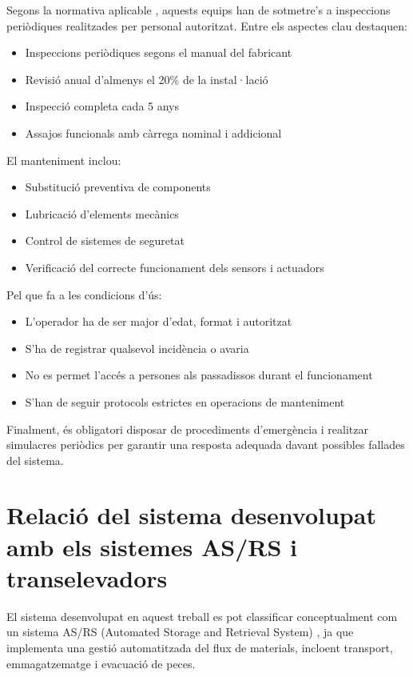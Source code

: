 \documentclass[12pt,a4paper]{report}
\begin{document}
Segons la normativa aplicable \cite{manual_logistica}, aquests equips han de sotmetre's a inspeccions periòdiques realitzades per personal autoritzat. Entre els aspectes clau destaquen:

\begin{itemize}
    \item Inspeccions periòdiques segons el manual del fabricant
    \item Revisió anual d'almenys el 20\% de la instal·lació
    \item Inspecció completa cada 5 anys
    \item Assajos funcionals amb càrrega nominal i addicional
\end{itemize}

El manteniment inclou:

\begin{itemize}
    \item Substitució preventiva de components
    \item Lubricació d'elements mecànics
    \item Control de sistemes de seguretat
    \item Verificació del correcte funcionament dels sensors i actuadors
\end{itemize}

Pel que fa a les condicions d'ús:

\begin{itemize}
    \item L'operador ha de ser major d'edat, format i autoritzat
    \item S'ha de registrar qualsevol incidència o avaria
    \item No es permet l'accés a persones als passadissos durant el funcionament
    \item S'han de seguir protocols estrictes en operacions de manteniment
\end{itemize}

Finalment, és obligatori disposar de procediments d'emergència i realitzar simulacres periòdics per garantir una resposta adequada davant possibles fallades del sistema.

\section{Relació del sistema desenvolupat amb els sistemes AS/RS i transelevadors}

El sistema desenvolupat en aquest treball es pot classificar conceptualment com un sistema AS/RS (Automated Storage and Retrieval System) \cite{asrs_daifuku}, ja que implementa una gestió automatitzada del flux de materials, incloent transport, emmagatzematge i evacuació de peces.
\end{document}
